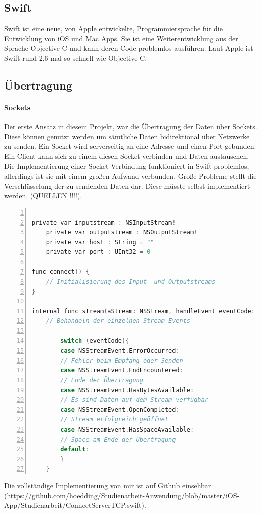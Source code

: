\subsection{Swift}
Swift ist eine neue, von Apple entwickelte, Programmiersprache für die Entwicklung von iOS und Mac Apps. Sie ist eine Weiterentwicklung aus der Sprache Objective-C und kann deren Code problemlos ausführen. Laut Apple ist Swift rund 2,6 mal so schnell wie Objective-C.

\subsection{Übertragung}

\paragraph{Sockets}
Der erste Ansatz in diesem Projekt, war die Übertragung der Daten über Sockets. Diese können genutzt werden um sämtliche Daten bidirektional über Netzwerke zu senden. Ein Socket wird serverseitig an eine Adresse und einen Port gebunden. Ein Client kann sich zu einem diesen Socket verbinden und Daten austauschen. \\
Die Implementierung einer Socket-Verbindung funktioniert in Swift problemlos, allerdings ist sie mit einem großen Aufwand verbunden. Große Probleme stellt die Verschlüsselung der zu sendenden Daten dar. Diese müsste selbst implementiert werden. (QUELLEN !!!!). 
\begin{lstlisting}[caption =Implementierung einer Socketverbindung in Swift (Schematische Darstellung), language=C, frame=single, breaklines=true,columns=fullflexible, commentstyle=\color{gray}\upshape, captionpos=b, numbers = left]

private var inputstream : NSInputStream!
    private var outputstream : NSOutputStream!
    private var host : String = ""
    private var port : UInt32 = 0

func connect() {        
	// Initialisierung des Input- und Outputstreams
}

internal func stream(aStream: NSStream, handleEvent eventCode: NSStreamEvent) {
	// Behandeln der einzelnen Stream-Events

        switch (eventCode){
        case NSStreamEvent.ErrorOccurred:
		// Fehler beim Empfang oder Senden
        case NSStreamEvent.EndEncountered:
		// Ende der Übertragung
        case NSStreamEvent.HasBytesAvailable:
		// Es sind Daten auf dem Stream verfügbar
        case NSStreamEvent.OpenCompleted:
		// Stream erfolgreich geöffnet
        case NSStreamEvent.HasSpaceAvailable:
		// Space am Ende der Übertragung
        default:
        }
    }

\end{lstlisting}
Die vollständige Implementierung von mir ist auf Github einsehbar (https://github.com/hoedding/Studienarbeit-Anwendung/blob/master/iOS-App/Studienarbeit/ConnectServerTCP.swift).

